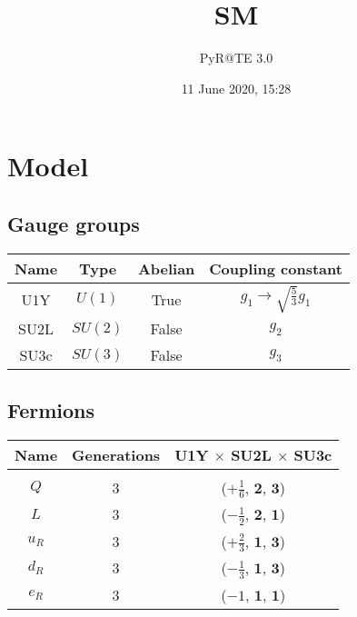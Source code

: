 \documentclass[12pt]{article}
\title{SM}
\author{PyR@TE 3.0}
\date{11 June 2020, 15:28}
\begin{document}
    \maketitle
    \tableofcontents
    \clearpage

\section{Model}

\subsection{Gauge groups}

\begin{table}[h]
\renewcommand{\arraystretch}{1.3}
\centering
\begin{tabular}{c@{\hskip .66cm}c@{\hskip .66cm}c@{\hskip .5cm}c}
\hline
Name & Type & Abelian & Coupling constant \\ \hline
U1Y & $U(1)$ & True & $g_1\rightarrow\sqrt{\frac{5}{3}} g_{1}$ \\
SU2L & $SU(2)$ & False & $g_2$ \\
SU3c & $SU(3)$ & False & $g_3$ \\ \hline
\end{tabular}
\end{table}

\subsection{Fermions}

\begin{table}[h]
\renewcommand{\arraystretch}{1.15}
\centering
\begin{tabular}{c@{\hskip .66cm}c@{\hskip .66cm}c}
\hline
Name & Generations & U1Y $\times$ SU2L $\times$ SU3c\\ \hline \\ [-2ex]
$Q$ & 3 & ($+\frac{1}{6}$, $\mathbf{2}$, $\mathbf{3}$) \\[.2cm]
$L$ & 3 & ($- \frac{1}{2}$, $\mathbf{2}$, $\mathbf{1}$) \\[.2cm]
$u_R$ & 3 & ($+\frac{2}{3}$, $\mathbf{1}$, $\mathbf{3}$) \\[.2cm]
$d_R$ & 3 & ($- \frac{1}{3}$, $\mathbf{1}$, $\mathbf{3}$) \\[.2cm]
$e_R$ & 3 & ($-1$, $\mathbf{1}$, $\mathbf{1}$) \\[.1cm] \hline
\end{tabular}
\end{table}
\end{document}
